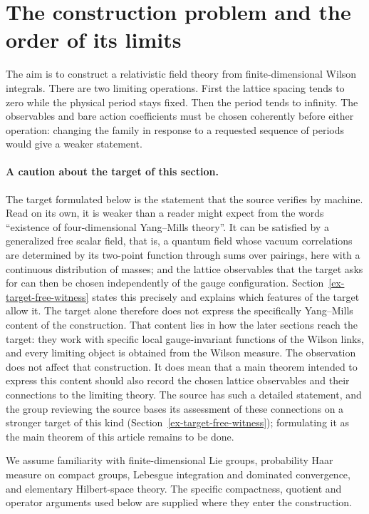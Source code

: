 \section{The construction problem and the order of its limits}
\label{ex-statement}

The aim is to construct a relativistic field theory from finite-dimensional
Wilson integrals. There are two limiting operations. First the lattice spacing
tends to zero while the physical period stays fixed. Then the period tends to
infinity. The observables and bare action coefficients must be chosen coherently
before either operation: changing the family in response to a requested sequence
of periods would give a weaker statement.

\paragraph{A caution about the target of this section.}
The target formulated below is the statement that the source verifies by
machine. Read on its own, it is weaker than a reader might expect from the
words ``existence of four-dimensional Yang--Mills theory''. It can be
satisfied by a generalized free scalar field, that is, a quantum field whose
vacuum correlations are determined by its two-point function through sums
over pairings, here with a continuous distribution of masses; and the lattice
observables that the target asks for can then be chosen independently of the
gauge configuration. Section~\ref{ex-target-free-witness} states this
precisely and explains which features of the target allow it. The target
alone therefore does not express the specifically Yang--Mills content of the
construction. That content lies in how the later sections reach the target:
they work with specific local gauge-invariant functions of the Wilson links,
and every limiting object is obtained from the Wilson measure. The
observation does not affect that construction. It does mean that a main
theorem intended to express this content should also record the chosen
lattice observables and their connections to the limiting theory. The source
has such a detailed statement, and the group reviewing the source bases its
assessment of these connections on a stronger target of this kind
(Section~\ref{ex-target-free-witness}); formulating it as the main theorem of
this article remains to be done.

We assume familiarity with finite-dimensional Lie groups, probability Haar
measure on compact groups, Lebesgue integration and dominated convergence,
and elementary Hilbert-space theory. The specific compactness, quotient and
operator arguments used below are supplied where they enter the construction.

